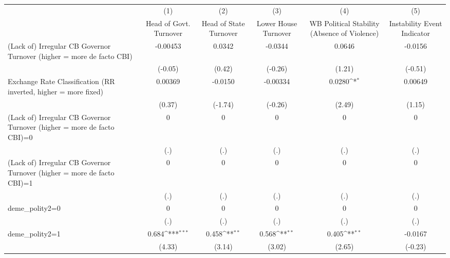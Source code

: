 {
\def\sym#1{\ifmmode^{#1}\else\(^{#1}\)\fi}
\begin{tabular}{l*{5}{c}}
\hline\hline
                &\multicolumn{1}{c}{(1)}&\multicolumn{1}{c}{(2)}&\multicolumn{1}{c}{(3)}&\multicolumn{1}{c}{(4)}&\multicolumn{1}{c}{(5)}\\
                &\multicolumn{1}{c}{Head of Govt. Turnover}&\multicolumn{1}{c}{Head of State Turnover}&\multicolumn{1}{c}{Lower House Turnover}&\multicolumn{1}{c}{WB Political Stability (Absence of Violence)}&\multicolumn{1}{c}{Instability Event Indicator}\\
\hline
(Lack of) Irregular CB Governor Turnover (higher = more de facto CBI)& -0.00453         &   0.0342         &  -0.0344         &   0.0646         &  -0.0156         \\
                &  (-0.05)         &   (0.42)         &  (-0.26)         &   (1.21)         &  (-0.51)         \\
[1em]
Exchange Rate Classification (RR inverted, higher = more fixed)&  0.00369         &  -0.0150         & -0.00334         &   0.0280\sym{*}  &  0.00649         \\
                &   (0.37)         &  (-1.74)         &  (-0.26)         &   (2.49)         &   (1.15)         \\
[1em]
(Lack of) Irregular CB Governor Turnover (higher = more de facto CBI)=0&        0         &        0         &        0         &        0         &        0         \\
                &      (.)         &      (.)         &      (.)         &      (.)         &      (.)         \\
[1em]
(Lack of) Irregular CB Governor Turnover (higher = more de facto CBI)=1&        0         &        0         &        0         &        0         &        0         \\
                &      (.)         &      (.)         &      (.)         &      (.)         &      (.)         \\
[1em]
deme\_polity2=0  &        0         &        0         &        0         &        0         &        0         \\
                &      (.)         &      (.)         &      (.)         &      (.)         &      (.)         \\
[1em]
deme\_polity2=1  &    0.684\sym{***}&    0.458\sym{**} &    0.568\sym{**} &    0.405\sym{**} &  -0.0167         \\
                &   (4.33)         &   (3.14)         &   (3.02)         &   (2.65)         &  (-0.23)         \\

\end{tabular}}
